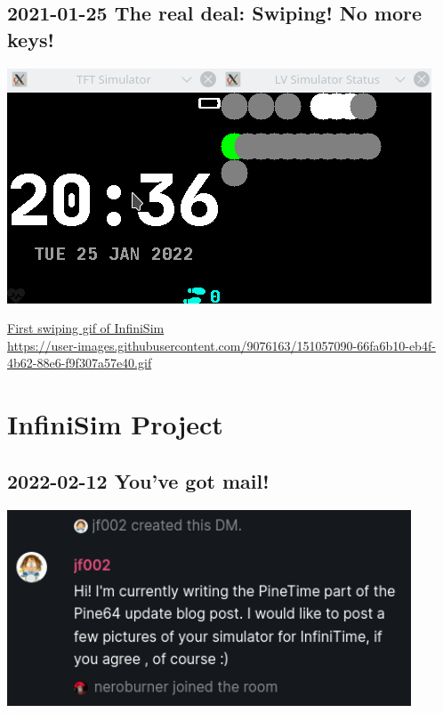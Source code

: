 \documentclass{beamer}
\begin{document}
\subsection{2021-01-25 The real deal: Swiping! No more keys!}
\begin{frame}{}
  \centering\includegraphics[width=\textwidth]{../2022-01-25_swiping-0}

  \href{https://user-images.githubusercontent.com/9076163/151057090-66fa6b10-eb4f-4b62-88e6-f9f307a57e40.gif}{
    First swiping gif of InfiniSim\\
  \quad \small https://user-images.githubusercontent.com/9076163/151057090-66fa6b10-eb4f-4b62-88e6-f9f307a57e40.gif}
\end{frame}

\section{InfiniSim Project}

\subsection{2022-02-12 You've got mail!}
\begin{frame}{}

  \centering\includegraphics[width=0.9\textwidth]{../2022-02-12_jf002_matrix}

\end{frame}
\end{document}

